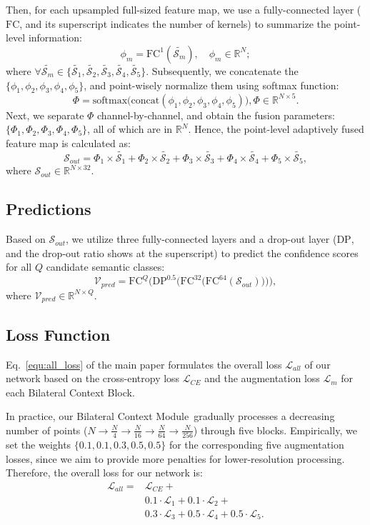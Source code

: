 \documentclass[10pt,twocolumn,letterpaper]{article}
\def\ourencoder{Bilateral Context Module}
\def\ourblock{Bilateral Context Block}
\begin{document}
Then, for each upsampled full-sized feature map, we use a fully-connected layer ($\mathrm{FC}$, and its superscript indicates the number of kernels) to summarize the point-level information:
$$
    \phi_m = {\mathrm{FC}}^1({\tilde{\mathcal{S}_m}}), \quad \phi_m\in\mathbb{R}^{N}; 
$$
where ${\forall}{\tilde{\mathcal{S}_m}}\in\{{\tilde{\mathcal{S}_1}}, {\tilde{\mathcal{S}_2}}, {\tilde{\mathcal{S}_3}}, {\tilde{\mathcal{S}_4}}, {\tilde{\mathcal{S}_5}}\}$. Subsequently, we concatenate the $\{\phi_1, \phi_2, \phi_3, \phi_4, \phi_5\}$, and point-wisely normalize them using softmax function:
$$
    \Phi = \mathrm{softmax}\big(\mathrm{concat}(\phi_1, \phi_2, \phi_3, \phi_4, \phi_5)\big), \Phi\in\mathbb{R}^{N\times 5}.
$$
Next, we separate $\Phi$ channel-by-channel, and obtain the fusion parameters: $\{\Phi_1, \Phi_2, \Phi_3, \Phi_4, \Phi_5\}$, all of which are in $\mathbb{R}^{N}$. Hence, the point-level adaptively fused feature map is calculated as:
$$
    \mathcal{S}_{out} = \Phi_1\times {\tilde{\mathcal{S}_1}} + \Phi_2\times {\tilde{\mathcal{S}_2}} + \Phi_3\times {\tilde{\mathcal{S}_3}} + \Phi_4\times {\tilde{\mathcal{S}_4}} + \Phi_5\times {\tilde{\mathcal{S}_5}},  
$$
where $\mathcal{S}_{out}\in\mathbb{R}^{N\times 32}$.

\subsection{Predictions}
Based on $\mathcal{S}_{out}$, we utilize three fully-connected layers and a drop-out layer ($\mathrm{DP}$, and the drop-out ratio shows at the superscript) to predict the confidence scores for all $Q$ candidate semantic classes:
$$
    \mathcal{V}_{pred} = \mathrm{FC}^{Q}\bigg(\mathrm{DP}^{0.5}\Big(\mathrm{FC}^{32}\big(\mathrm{FC}^{64}(\mathcal{S}_{out})\big)\Big)\bigg), 
$$
where $\mathcal{V}_{pred}\in\mathbb{R}^{N\times Q}$.
\subsection{Loss Function} Eq.~\ref{equ:all_loss} of the main paper formulates the overall loss $\mathcal{L}_{all}$ of our network based on the cross-entropy loss $\mathcal{L}_{CE}$ and the augmentation loss $\mathcal{L}_m$ for each \ourblock.

In practice, our \ourencoder~gradually processes a decreasing number of points ($N\rightarrow\frac{N}{4}\rightarrow\frac{N}{16}\rightarrow  \frac{N}{64}\rightarrow\frac{N}{256}$) through five blocks. Empirically, we set the weights $\{0.1, 0.1, 0.3, 0.5, 0.5\}$ for the corresponding five augmentation losses, since we aim to provide more penalties for lower-resolution processing. Therefore, the overall loss for our network is:
$$
    \begin{aligned}
            \mathcal{L}_{all} = &\mathcal{L}_{CE} +\\ &0.1\cdot\mathcal{L}_1 + 0.1\cdot\mathcal{L}_2 +\\ 
            &0.3\cdot\mathcal{L}_3 + 0.5\cdot\mathcal{L}_4 + 0.5\cdot\mathcal{L}_5.
    \end{aligned}
$$
\end{document}
